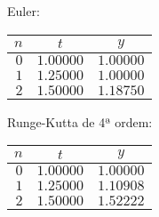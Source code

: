 \begin{center}
\begin{minipage}[c]{0.5\textwidth}
\begin{center} Euler:\\ \begin{tabular}{r | c c}
	$n$ & $t$ & $y$ \\ \hline
	$0$ & $1.00000$ & $1.00000$ \\
	$1$ & $1.25000$ & $1.00000$ \\
	$2$ & $1.50000$ & $1.18750$
\end{tabular} \end{center}
\end{minipage}%
\begin{minipage}[c]{0.5\textwidth}
\begin{center} Runge-Kutta de 4ª ordem:\\ \begin{tabular}{r | c c}
	$n$ & $t$ & $y$ \\ \hline
	$0$ & $1.00000$ & $1.00000$ \\
	$1$ & $1.25000$ & $1.10908$ \\
	$2$ & $1.50000$ & $1.52222$
\end{tabular} \end{center}
\end{minipage}
\end{center}

